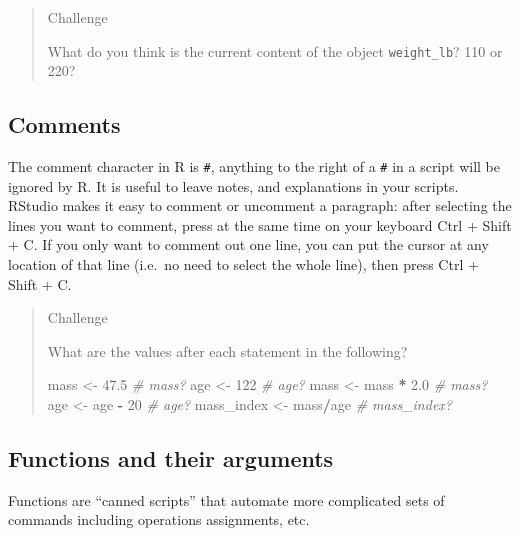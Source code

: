 \documentclass[
]{book}
\newenvironment{Shaded}{\begin{snugshade}}{\end{snugshade}}
\newcommand{\CommentTok}[1]{\textcolor[rgb]{0.56,0.35,0.01}{\textit{#1}}}
\newcommand{\DecValTok}[1]{\textcolor[rgb]{0.00,0.00,0.81}{#1}}
\newcommand{\FloatTok}[1]{\textcolor[rgb]{0.00,0.00,0.81}{#1}}
\newcommand{\NormalTok}[1]{#1}
\newcommand{\OperatorTok}[1]{\textcolor[rgb]{0.81,0.36,0.00}{\textbf{#1}}}
\newcommand{\StringTok}[1]{\textcolor[rgb]{0.31,0.60,0.02}{#1}}
\begin{document}
\begin{quote}
Challenge

What do you think is the current content of the object \texttt{weight\_lb}? 110 or 220?
\end{quote}

\hypertarget{comments}{%
\subsection{Comments}\label{comments}}

The comment character in R is \texttt{\#}, anything to the right of a \texttt{\#} in a script
will be ignored by R. It is useful to leave notes, and explanations in your
scripts.
RStudio makes it easy to comment or uncomment a paragraph: after selecting the
lines you want to comment, press at the same time on your keyboard
Ctrl + Shift + C. If you only want to comment
out one line, you can put the cursor at any location of that line (i.e.~no need
to select the whole line), then press Ctrl + Shift +
C.

\begin{quote}
Challenge

What are the values after each statement in the following?

\begin{Shaded}
\begin{Highlighting}[]
\NormalTok{mass <-}\StringTok{ }\FloatTok{47.5}            \CommentTok{# mass?}
\NormalTok{age  <-}\StringTok{ }\DecValTok{122}             \CommentTok{# age?}
\NormalTok{mass <-}\StringTok{ }\NormalTok{mass }\OperatorTok{*}\StringTok{ }\FloatTok{2.0}      \CommentTok{# mass?}
\NormalTok{age  <-}\StringTok{ }\NormalTok{age }\OperatorTok{-}\StringTok{ }\DecValTok{20}        \CommentTok{# age?}
\NormalTok{mass_index <-}\StringTok{ }\NormalTok{mass}\OperatorTok{/}\NormalTok{age  }\CommentTok{# mass_index?}
\end{Highlighting}
\end{Shaded}
\end{quote}

\hypertarget{functions-and-their-arguments}{%
\subsection{Functions and their arguments}\label{functions-and-their-arguments}}

Functions are ``canned scripts'' that automate more complicated sets of commands
including operations assignments, etc.
\end{document}
